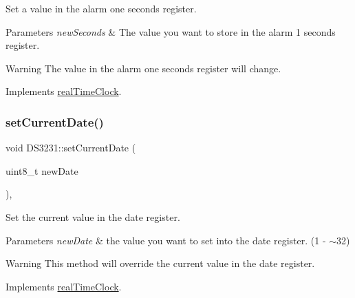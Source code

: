 Set a value in the alarm one seconds register. 


\begin{DoxyParams}{Parameters}
{\em new\+Seconds} & The value you want to store in the alarm 1 seconds register. \\
\hline
\end{DoxyParams}
\begin{DoxyWarning}{Warning}
The value in the alarm one seconds register will change. 
\end{DoxyWarning}


Implements \mbox{\hyperlink{classreal_time_clock_a448cbe8ab7f6649ee32eeb415721707f}{real\+Time\+Clock}}.

\mbox{\label{class_d_s3231_a597a0d5cb33f8b60f81dba9050ca1363}} 
\subsubsection{\texorpdfstring{set\+Current\+Date()}{setCurrentDate()}}
{\footnotesize\ttfamily void D\+S3231\+::set\+Current\+Date (\begin{DoxyParamCaption}\item[{uint8\+\_\+t}]{new\+Date }\end{DoxyParamCaption})\hspace{0.3cm}{\ttfamily [override]}, {\ttfamily [virtual]}}



Set the current value in the date register. 


\begin{DoxyParams}{Parameters}
{\em new\+Date} & the value you want to set into the date register. (1 -\/ $\sim$32) \\
\hline
\end{DoxyParams}
\begin{DoxyWarning}{Warning}
This method will override the current value in the date register. 
\end{DoxyWarning}


Implements \mbox{\hyperlink{classreal_time_clock_a7db563a518ae7b87ca6d77860906e517}{real\+Time\+Clock}}.

\mbox{\label{class_d_s3231_ae43a887db6022008c066a257acd68ae8}} 
